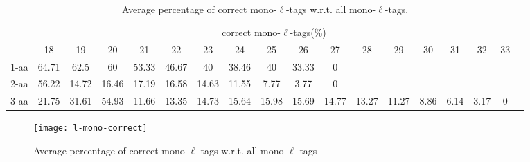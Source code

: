 \documentclass{article}[12pt]
\begin{document}
\begin{landscape}
\begin{table}[h]
\vspace{3mm}
\end{table}
\begin{table}[h]\tiny
\vspace{3mm}
{\centering
\begin{center}
\begin{tabular}{|l|c|c|c|c|c|c|c|c|c|c|c|c|c|c|c|c|c|}
  \hline
  & \multicolumn{ 16 }{|c|}{correct mono-$\ell$-tags(\%)} \\
  \cline{2- 17}
    & 18 & 19 & 20 & 21 & 22 & 23 & 24 & 25 & 26 & 27 & 28 & 29 & 30 & 31 & 32 & 33\\
  \hline
1-aa  & 64.71 & 62.5 & 60 & 53.33 & 46.67 & 40 & 38.46 & 40 & 33.33 & 0 &  &  &  &  &  & \\
2-aa  & 56.22 & 14.72 & 16.46 & 17.19 & 16.58 & 14.63 & 11.55 & 7.77 & 3.77 & 0 &  &  &  &  &  & \\
3-aa  & 21.75 & 31.61 & 54.93 & 11.66 & 13.35 & 14.73 & 15.64 & 15.98 & 15.69 & 14.77 & 13.27 & 11.27 & 8.86 & 6.14 & 3.17 & 0\\
 \hline
\end{tabular}
\end{center}
\par}
\centering

\caption{ Average percentage of correct mono-$\ell$-tags w.r.t. all mono-$\ell$-tags.}
\label{table:l-mono-correct}

\vspace{3mm}
\end{table}
\end{landscape}

\begin{figure}
  \begin{center}
\texttt{[image: l-mono-correct]}
\end{center}
\caption{Average percentage of correct mono-$\ell$-tags w.r.t. all mono-$\ell$-tags}
  \label{fig:l-mono-correct}
\end{figure}


\end{document}
